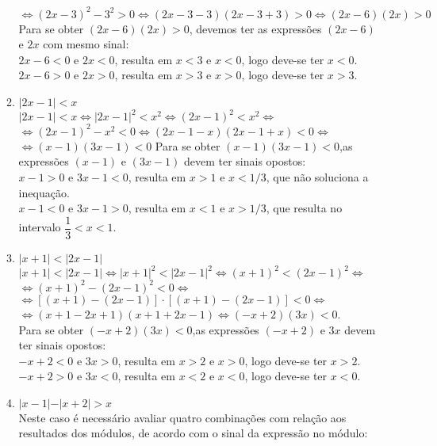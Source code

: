 \begin{enumerate}
\begin{enumerate}
		$\Leftrightarrow (2x - 3)^2 - 3^2 > 0 \Leftrightarrow (2x - 3 - 3)(2x - 3 + 3) >  0 \Leftrightarrow (2x-6)(2x) > 0$ \\
		Para se obter  $(2x-6)(2x) > 0$, devemos ter as expressões  $(2x-6)$ e $2x$  com mesmo sinal:\\
		$2x-6 < 0$ e $2x < 0$,  resulta em $x < 3$ e $x < 0$, logo deve-se ter $x < 0$.\\
		$2x-6 > 0$ e $2x > 0$,  resulta em $x > 3$ e $x > 0$, logo deve-se ter $x > 3$.
		\item %
		$\vert 2x - 1 \vert < x$\\
		$\vert 2x - 1 \vert < x \Leftrightarrow \vert 2x - 1 \vert^2 < x^2 \Leftrightarrow ( 2x - 1 )^2 < x^2 \Leftrightarrow$\\
		$\Leftrightarrow (2x-1)^2 - x^2 < 0 \Leftrightarrow (2x - 1 -x)(2x-1+x) < 0 \Leftrightarrow$\\
		$\Leftrightarrow (x-1)(3x-1) < 0$
		Para se obter  $(x-1)(3x-1) < 0$,as expressões $(x-1)$ e $(3x-1)$ devem ter sinais opostos:\\
		$x-1 >0$ e $3x-1 <0$, resulta em $x > 1$ e $x < 1/3$, que não soluciona a inequação.\\
		$x-1 <0$ e $3x-1 >0$, resulta em $x < 1$ e $x > 1/3$, que resulta no intervalo $\dfrac{1}{3}<x<1$.
		\addtocounter{enumii}{1}
		\item %
		$\vert x+ 1 \vert < \vert 2x - 1 \vert$\\
		$\vert x+ 1 \vert < \vert 2x - 1 \vert \Leftrightarrow \vert x+ 1 \vert^2 < \vert 2x - 1 \vert^2 \Leftrightarrow ( x + 1 )^2 < ( 2x - 1 )^2 \Leftrightarrow$\\ 
		$\Leftrightarrow ( x + 1 )^2 - ( 2x - 1 )^2 < 0 \Leftrightarrow$\\
		$\Leftrightarrow [( x + 1 ) - ( 2x - 1 )]\cdot[( x + 1 ) - ( 2x - 1 )] < 0 \Leftrightarrow$\\ 
		$\Leftrightarrow (x + 1 -2x +1)(x+1+2x-1) \Leftrightarrow (-x+2)(3x)<0$.\\
		Para se obter  $(-x+2)(3x)<0$,as expressões $(-x+2)$ e $3x$ devem ter sinais opostos:\\
		$-x+2 < 0$ e $3x > 0$,  resulta em $x > 2$ e $x > 0$, logo deve-se ter $x > 2$.\\
		$-x+2 > 0$ e $3x < 0$,  resulta em $x < 2$ e $x < 0$, logo deve-se ter $x < 0$.
		\item %
		$\vert x - 1 \vert - \vert x + 2 \vert > x$\\
		Neste caso é necessário avaliar quatro combinações com relação aos resultados dos módulos, de acordo com o sinal da expressão no módulo:

\end{enumerate}
\end{enumerate}
